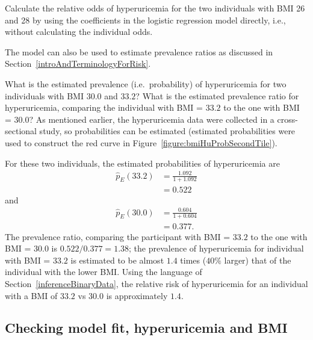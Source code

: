 \begin{exercisewrap}
  \begin{nexercise}
    Calculate the relative odds of hyperuricemia for the two individuals with BMI 26 and 28 by using the coefficients in the logistic regression model directly, i.e., without calculating the individual odds.
    \footnotemark{}
  \end{nexercise}
\end{exercisewrap}

The model can also be used to estimate prevalence ratios as discussed in Section~\ref{introAndTerminologyForRisk}.

\begin{examplewrap}
  \begin{nexample}{What is the estimated prevalence (i.e.\ probability) of hyperuricemia for two individuals with BMI $30.0$ and $33.2$? What is the estimated prevalence ratio for hyperuricemia, comparing the individual with BMI = $33.2$ to the one with BMI = $30.0$?}\label{example:RRHyperuricemia33v30}
    As mentioned earlier, the hyperuricemia data were collected in a cross-sectional study, so probabilities can be estimated (estimated probabilities were used to construct the red curve in Figure~\ref{figure:bmiHuProbSecondTile}).

    For these two individuals, the estimated probabilities of hyperuricemia are
\begin{align*}
  \hat{p}_E(33.2) &=\frac{1.092}{1 + 1.092} \\
            &= 0.522
\end{align*}
and
\begin{align*}
  \hat{p}_E(30.0) &=\frac{0.604}{1 + 0.604} \\
            &= 0.377.
\end{align*}
The prevalence ratio, comparing the participant with BMI = $33.2$ to the one with BMI = $30.0$ is $0.522/0.377 = 1.38$; the prevalence of hyperuricemia for individual with BMI = $33.2$ is estimated to be almost $1.4$ times ($40\%$ larger) that of the individual with the lower BMI.  Using the language of 
Section~\ref{inferenceBinaryData}, the relative risk of hyperuricemia for an individual with a BMI of $33.2$ vs $30.0$ is approximately $1.4$.
  \end{nexample}
\end{examplewrap}

\subsection{Checking model fit, hyperuricemia and BMI}
\label{assessingFitHyperuricemiaBMI}

